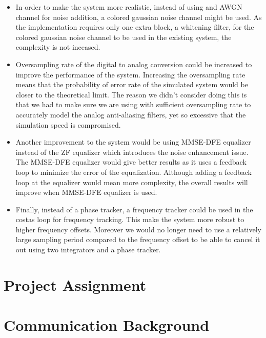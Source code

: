 \documentclass[]{article}
\begin{document}
\begin{itemize}
\item In order to make the system more realistic, instead of using and AWGN channel for noise addition, a colored gaussian noise channel might be used. As the implementation requires only one extra block, a whitening filter, for the colored gaussian noise channel to be used in the existing system, the complexity is not inceased. 
\item Oversampling rate of the digital to analog conversion could be increased to improve the performance of the system. Increasing the oversampling rate means that the probability of error rate of the simulated system would be closer to the theoretical limit. The reason we didn't consider doing this is that we had to make sure we are using with sufficient oversampling rate to accurately model the analog anti-aliasing filters, yet so excessive that the simulation speed is compromised.
\item Another improvement to the system would be using MMSE-DFE equalizer instead of the ZF equalizer which introduces the noise enhancement issue. The MMSE-DFE equalizer would give better results as it uses a feedback loop to minimize the error of the equalization. Although adding a feedback loop at the equalizer would mean more complexity, the overall results will improve when MMSE-DFE equalizer is used.
\item Finally, instead of a phase tracker, a frequency tracker could be used in the costas loop for frequency tracking. This make the system more robust to higher frequency offsets. Moreover we would no longer need to use a relatively large sampling period compared to the frequency offset to be able to cancel it out using two integrators and a phase tracker. 
\end{itemize}


\appendix
\newpage


\newpage
\section{Project Assignment}
\label{app:assign}

\cleardoublepage
\newpage

\section{Communication Background}
\end{document}
